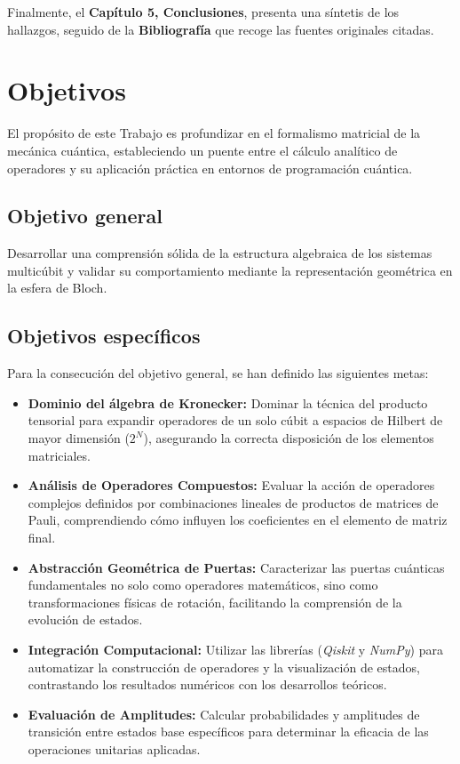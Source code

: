 \documentclass[11pt,a4paper,spanish]{book}
\begin{document}
Finalmente, el \textbf{Capítulo 5, Conclusiones}, presenta una síntetis de los hallazgos, seguido de la \textbf{Bibliografía} que recoge las fuentes originales citadas.

\chapter{Objetivos}

El propósito de este Trabajo es profundizar en el formalismo matricial de la mecánica cuántica, estableciendo un puente entre el cálculo analítico de operadores y su aplicación práctica en entornos de programación cuántica.

\section{Objetivo general}
Desarrollar una comprensión sólida de la estructura algebraica de los sistemas multicúbit y validar su comportamiento mediante la representación geométrica en la esfera de Bloch.

\section{Objetivos específicos}
Para la consecución del objetivo general, se han definido las siguientes metas:

\begin{itemize}
    \item \textbf{Dominio del álgebra de Kronecker:} Dominar la técnica del producto tensorial para expandir operadores de un solo cúbit a espacios de Hilbert de mayor dimensión ($2^N$), asegurando la correcta disposición de los elementos matriciales.
    \item \textbf{Análisis de Operadores Compuestos:} Evaluar la acción de operadores complejos definidos por combinaciones lineales de productos de matrices de Pauli, comprendiendo cómo influyen los coeficientes en el elemento de matriz final.
    \item \textbf{Abstracción Geométrica de Puertas:} Caracterizar las puertas cuánticas fundamentales no solo como operadores matemáticos, sino como transformaciones físicas de rotación, facilitando la comprensión de la evolución de estados.
    \item \textbf{Integración Computacional:} Utilizar las librerías (\textit{Qiskit} y \textit{NumPy}) para automatizar la construcción de operadores y la visualización de estados, contrastando los resultados numéricos con los desarrollos teóricos.
    \item \textbf{Evaluación de Amplitudes:} Calcular probabilidades y amplitudes de transición entre estados base específicos para determinar la eficacia de las operaciones unitarias aplicadas.
\end{itemize}
\end{document}
